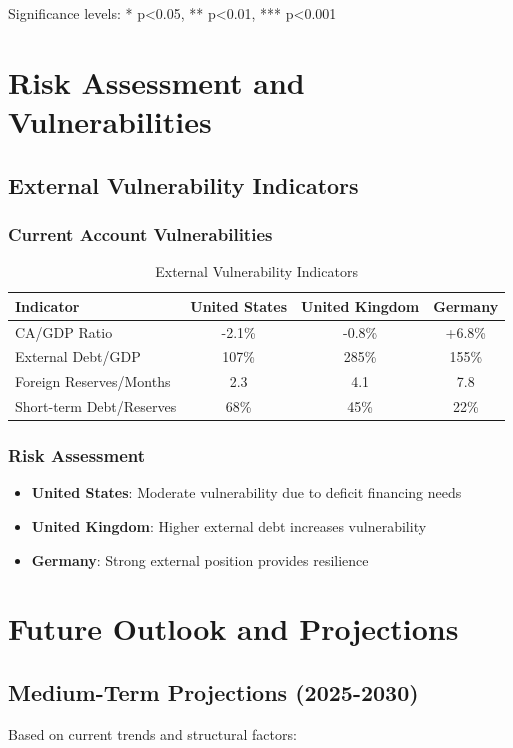 \documentclass[11pt,a4paper]{article}
\begin{document}
Significance levels: * p<0.05, ** p<0.01, *** p<0.001

\section{Risk Assessment and Vulnerabilities}

\subsection{External Vulnerability Indicators}

\subsubsection{Current Account Vulnerabilities}
\begin{table}[h]
\centering
\caption{External Vulnerability Indicators}
\begin{tabular}{lccc}
\toprule
\textbf{Indicator} & \textbf{United States} & \textbf{United Kingdom} & \textbf{Germany} \\
\midrule
CA/GDP Ratio & -2.1\% & -0.8\% & +6.8\% \\
External Debt/GDP & 107\% & 285\% & 155\% \\
Foreign Reserves/Months & 2.3 & 4.1 & 7.8 \\
Short-term Debt/Reserves & 68\% & 45\% & 22\% \\
\bottomrule
\end{tabular}
\end{table}

\subsubsection{Risk Assessment}
\begin{itemize}
    \item \textbf{United States}: Moderate vulnerability due to deficit financing needs
    \item \textbf{United Kingdom}: Higher external debt increases vulnerability
    \item \textbf{Germany}: Strong external position provides resilience
\end{itemize}

\section{Future Outlook and Projections}

\subsection{Medium-Term Projections (2025-2030)}
Based on current trends and structural factors:
\end{document}
